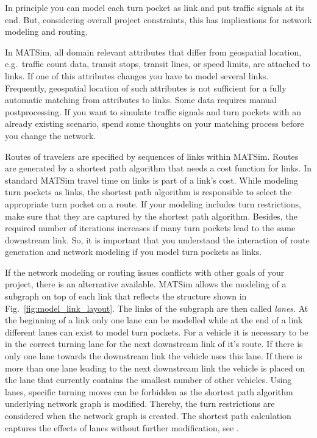 In principle you can model each turn pocket as link and put traffic signals at its end. 
But, considering overall project constraints, this has implications for network modeling and routing. 

In MATSim, all domain relevant attributes that differ from geospatial location, e.g.~traffic count data, transit stops, transit lines, or speed limits, are attached to links. 
If one of this attributes changes you have to model several links. 
Frequently, geospatial location of such attributes is not sufficient for a fully automatic matching from attributes to links. 
Some data requires manual postprocessing. 
If you want to simulate traffic signals and turn pockets with an already existing scenario, spend some thoughts on your matching process before you change the network.  

Routes of travelers are specified by sequences of links within MATSim. 
Routes are generated by a shortest path algorithm that needs a cost function for links. 
In standard MATSim travel time on links is part of a link's cost.
While modeling turn pockets as links, the shortest path algorithm is responsible to select the appropriate turn pocket on a route.
If your modeling includes turn restrictions, make sure that they are captured by the shortest path algorithm. 
Besides, the required number of iterations increases if many turn pockets lead to the same downstream link. 
So, it is important that you understand the interaction of route generation and network modeling if you model turn pockets as links. 

If the network modeling or routing issues conflicts with other goals of your project, there is an alternative available. 
MATSim allows the modeling of a subgraph on top of each link that reflects the structure shown in Fig.~\ref{fig:model_link_layout}. 
The links of the subgraph are then called \emph{lanes}. 
At the beginning of a link only one lane can be modelled while at the end of a link different lanes can exist to model turn pockets. 
For a vehicle it is necessary to be in the correct turning lane for the next downstream link of it's route. 
If there is only one lane towards the downstream link the vehicle uses this lane. 
If there is more than one lane leading to the next downstream link the vehicle is placed on the lane that currently contains the smallest number of other vehicles. %
Using lanes, specific turning moves can be forbidden as the shortest path algorithm underlying network graph is modified.  
Thereby, the turn restrictions are considered when the network graph is created. 
The shortest path calculation captures the effects of lanes without further modification, see \citet[][pp.~21]{Grether2014PhD}.  

